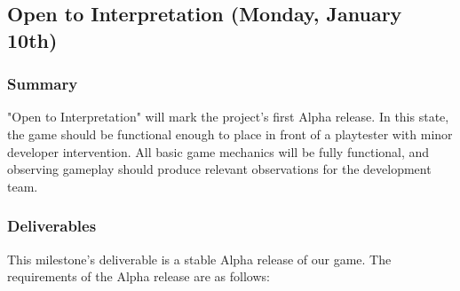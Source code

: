 \subsection{Open to Interpretation (Monday, January 10th)}

\subsubsection*{Summary}
"Open to Interpretation" will mark the project's first Alpha release. In this state, the game should be functional enough to place in front of a playtester with minor developer intervention. All basic game mechanics will be fully functional, and observing gameplay should produce relevant observations for the development team.

\subsubsection*{Deliverables}
This milestone’s deliverable is a stable Alpha release of our game. The requirements of the Alpha release are as follows:

